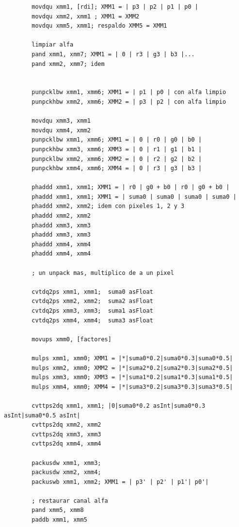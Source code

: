 \begin{codesnippet}
\begin{verbatim}
        movdqu xmm1, [rdi]; XMM1 = | p3 | p2 | p1 | p0 |
        movdqu xmm2, xmm1 ; XMM1 = XMM2
        movdqu xmm5, xmm1; respaldo XMM5 = XMM1

        limpiar alfa
        pand xmm1, xmm7; XMM1 = | 0 | r3 | g3 | b3 |...
        pand xmm2, xmm7; idem
        
        
        punpcklbw xmm1, xmm6; XMM1 = | p1 | p0 | con alfa limpio
        punpckhbw xmm2, xmm6; XMM2 = | p3 | p2 | con alfa limpio
        
        movdqu xmm3, xmm1
        movdqu xmm4, xmm2
        punpcklbw xmm1, xmm6; XMM1 = | 0 | r0 | g0 | b0 |
        punpckhbw xmm3, xmm6; XMM3 = | 0 | r1 | g1 | b1 |
        punpcklbw xmm2, xmm6; XMM2 = | 0 | r2 | g2 | b2 |
        punpckhbw xmm4, xmm6; XMM4 = | 0 | r3 | g3 | b3 |
        
        phaddd xmm1, xmm1; XMM1 = | r0 | g0 + b0 | r0 | g0 + b0 |
        phaddd xmm1, xmm1; XMM1 = | suma0 | suma0 | suma0 | suma0 | 
        phaddd xmm2, xmm2; idem con pixeles 1, 2 y 3
        phaddd xmm2, xmm2
        phaddd xmm3, xmm3 
        phaddd xmm3, xmm3
        phaddd xmm4, xmm4
        phaddd xmm4, xmm4

        ; un unpack mas, multiplico de a un pixel

        cvtdq2ps xmm1, xmm1;  suma0 asFloat
        cvtdq2ps xmm2, xmm2;  suma2 asFloat
        cvtdq2ps xmm3, xmm3;  suma1 asFloat
        cvtdq2ps xmm4, xmm4;  suma3 asFloat

        movups xmm0, [factores]

        mulps xmm1, xmm0; XMM1 = |*|suma0*0.2|suma0*0.3|suma0*0.5|  
        mulps xmm2, xmm0; XMM2 = |*|suma2*0.2|suma2*0.3|suma2*0.5|  
        mulps xmm3, xmm0; XMM3 = |*|suma1*0.2|suma1*0.3|suma1*0.5|   
        mulps xmm4, xmm0; XMM4 = |*|suma3*0.2|suma3*0.3|suma3*0.5|   

        cvttps2dq xmm1, xmm1; |0|suma0*0.2 asInt|suma0*0.3 asInt|suma0*0.5 asInt|
        cvttps2dq xmm2, xmm2
        cvttps2dq xmm3, xmm3
        cvttps2dq xmm4, xmm4

        packusdw xmm1, xmm3; 
        packusdw xmm2, xmm4;
        packuswb xmm1, xmm2; XMM1 = | p3' | p2' | p1'| p0'|

        ; restaurar canal alfa
        pand xmm5, xmm8
        paddb xmm1, xmm5
\end{verbatim}
\end{codesnippet}

